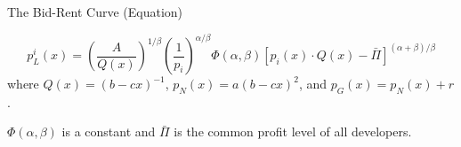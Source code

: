 \documentclass[11pt]{beamer}
\begin{document}
\begin{frame}{The Bid-Rent Curve (Equation)}

\[
p_L^i(x) = \left( \frac{A}{Q(x)}\right)^{1/\beta} \left( \frac{1}{p_i}\right)^{\alpha/\beta} \Phi(\alpha, \beta) \left[ p_i(x)\cdot Q(x) - \bar{\Pi} \right]^{(\alpha + \beta)/\beta}
\]
\vfill
where $Q(x)  = (b - cx)^{-1}$, $p_N(x) = a(b - cx)^{2}$, and $p_G(x) = p_N(x) + r$. 
\vfill

$\Phi(\alpha, \beta)$ is a constant and $\bar{\Pi}$ is the common profit level of all developers.


\end{frame}
\end{document}
